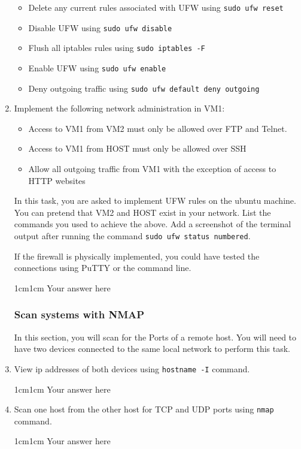\documentclass[11pt,letterpaper]{article}
\newenvironment{answer}{\em \color{blue} \begin{adjustwidth}{1cm}{1cm}}{\end{adjustwidth}}
\begin{document}
\begin{enumerate}
		\begin{itemize}
			\item Delete any current rules associated with UFW using \texttt{sudo ufw reset}
			\item Disable UFW using \texttt{sudo ufw disable}
			\item Flush all iptables rules using \texttt{sudo iptables -F}
			\item Enable UFW using \texttt{sudo ufw enable}
			\item Deny outgoing traffic using \texttt{sudo ufw default deny outgoing}
		\end{itemize}
		
		\item Implement the following network administration in VM1:
		\begin{itemize}
			\item Access to VM1 from VM2 must only be allowed over FTP and Telnet.
			\item Access to VM1 from HOST must only be allowed over SSH
			\item Allow all outgoing traffic from VM1 with the exception of access to HTTP websites
		\end{itemize}
		
		In this task, you are asked to implement UFW rules on the ubuntu machine. You can pretend that VM2 and HOST exist in your network. List the commands you used to achieve the above. Add a screenshot of the terminal output after running the command \texttt{sudo ufw status numbered}.
		
		If the firewall is physically implemented, you could have tested the connections using PuTTY or the command line.
		
		\begin{answer}
			Your answer here
		\end{answer}
		
		\subsubsection*{Scan systems with NMAP}
		In this section, you will scan for the Ports of a remote host. You will need to have two devices connected to the same local network to perform this task. 
		
		\item View ip addresses of both devices using \texttt{hostname -I} command.
		\begin{answer}
			Your answer here
		\end{answer}
		\item Scan one host from the other host for TCP and UDP ports using \texttt{nmap} command.
		\begin{answer}
			Your answer here
		\end{answer}\textbf{}
		

\end{enumerate}
\end{document}
